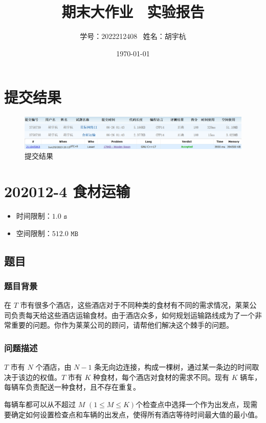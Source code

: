 \documentclass[UTF8, 12pt, a4paper, oneside]{ctexart}
\title{期末大作业 \ 实验报告}
\author{学号：2022212408 \ 姓名：胡宇杭}
\date{\today}
\begin{document}
\maketitle

\section*{提交结果}
\begin{figure}[htbp]
    \centering
    \includegraphics*[width = 5.7in]{提交结果.png}
    \caption{提交结果}
\end{figure}

\tableofcontents

\newpage
\section{202012-4 食材运输}
\begin{itemize}
    \item 时间限制：$1.0\texttt{ s}$
    \item 空间限制：$512.0\texttt{ MB}$
\end{itemize}
\subsection{题目}
\subsubsection{题目背景}
\par 在 $T$ 市有很多个酒店，这些酒店对于不同种类的食材有不同的需求情况，莱莱公司负责每天给这些酒店运输食材。由于酒店众多，如何规划运输路线成为了一个非常重要的问题。你作为莱莱公司的顾问，请帮他们解决这个棘手的问题。
\subsubsection{问题描述}
\par $T$ 市有 $N$ 个酒店，由 $N - 1$ 条无向边连接，构成一棵树，通过某一条边的时间取决于该边的权值。$T$ 市有 $K$ 种食材，每个酒店对食材的需求不同。现有 $K$ 辆车，每辆车负责配送一种食材，且不存在重复。
\par 每辆车都可以从不超过 $M$ $(1 \leq M \leq K)$个检查点中选择一个作为出发点，现需要确定如何设置检查点和车辆的出发点，使得所有酒店等待时间最大值的最小值。
\end{document}
